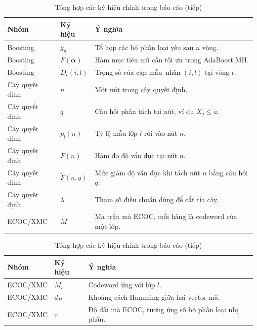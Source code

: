 \begin{table}[H]
\centering
\small
\caption{Tổng hợp các ký hiệu chính trong báo cáo (tiếp)}
\begin{tabular}{|>{\raggedright\arraybackslash}p{3.2cm}|>{\raggedright\arraybackslash}p{4.2cm}|>{\raggedright\arraybackslash}p{6.6cm}|}
\hline
\textbf{Nhóm} & \textbf{Ký hiệu} & \textbf{Ý nghĩa} \\
\hline
Boosting & $g_n$ & Tổ hợp các bộ phân loại yếu sau $n$ vòng. \\
\hline
Boosting & $F(\bm{\alpha})$ & Hàm mục tiêu mũ cần tối ưu trong AdaBoost.MH. \\
\hline
Boosting & $D_t(i,l)$ & Trọng số của cặp mẫu--nhãn $(i,l)$ tại vòng $t$. \\
\hline
Cây quyết định & $n$ & Một nút trong cây quyết định. \\
\hline
Cây quyết định & $q$ & Câu hỏi phân tách tại nút, ví dụ $X_j\leq a$. \\
\hline
Cây quyết định & $p_l(n)$ & Tỷ lệ mẫu lớp $l$ rơi vào nút $n$. \\
\hline
Cây quyết định & $F(n)$ & Hàm đo độ vẩn đục tại nút $n$. \\
\hline
Cây quyết định & $\widetilde{F}(n,q)$ & Mức giảm độ vẩn đục khi tách nút $n$ bằng câu hỏi $q$. \\
\hline
Cây quyết định & $\lambda$ & Tham số điều chuẩn dùng để cắt tỉa cây. \\
\hline
ECOC/XMC & $M$ & Ma trận mã ECOC, mỗi hàng là codeword của một lớp. \\
\hline
\end{tabular}
\end{table}

\begin{table}[H]
\centering
\small
\caption{Tổng hợp các ký hiệu chính trong báo cáo (tiếp)}
\begin{tabular}{|>{\raggedright\arraybackslash}p{3.2cm}|>{\raggedright\arraybackslash}p{4.2cm}|>{\raggedright\arraybackslash}p{6.6cm}|}
\hline
\textbf{Nhóm} & \textbf{Ký hiệu} & \textbf{Ý nghĩa} \\
\hline
ECOC/XMC & $M_l$ & Codeword ứng với lớp $l$. \\
\hline
ECOC/XMC & $d_H$ & Khoảng cách Hamming giữa hai vector mã. \\
\hline
ECOC/XMC & $c$ & Độ dài mã ECOC, tương ứng số bộ phân loại nhị phân. \\
\hline
\end{tabular}
\end{table}

